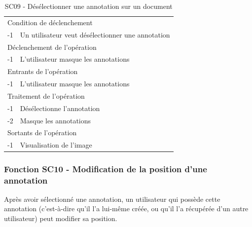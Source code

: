 \documentclass[a4paper]{article}
\begin{document}
\begin{table}[H]
  \centering
   \small
	\begin{tabular}{|c|p{12cm}|}
   		\hline
   			\rowcolor{lightgray}\multicolumn{2}{|c|}{\textbf{SC09 - Désélectionner une annotation sur un document}} \\
   		\hline
   			\multicolumn{2}{|l|}{Condition de d\'eclenchement} \\
   		\hline
   			-1 & Un utilisateur veut désélectionner une annotation\\
   		\hline
   			\multicolumn{2}{|l|}{D\'eclenchement de l'op\'eration} \\
   		\hline
   			-1 & L’utilisateur masque les annotations\\
   		\hline
   			\multicolumn{2}{|l|}{Entrants de l'op\'eration} \\
   		\hline
   			-1 & L’utilisateur masque les annotations\\
   		\hline
   			\multicolumn{2}{|l|}{Traitement de l'op\'eration} \\
  		\hline
   			-1 & Désélectionne l’annotation\\
			-2 & Masque les annotations\\
   		\hline
   			\multicolumn{2}{|l|}{Sortants de l'op\'eration} \\
   		\hline
   			-1 & Visualisation de l’image\\
   		\hline
	\end{tabular}
  \caption{SC09 - Désélectionner une annotation sur un document}
  \normalsize
  \label{tab:deselectionner_annotation}
\end{table}

\subsubsection{Fonction SC10 - Modification de la position d’une annotation}
Après avoir sélectionné une annotation, un utilisateur qui possède cette annotation (c’est-à-dire qu’il l’a lui-même créée, ou qu’il l’a récupérée d’un autre utilisateur) peut modifier sa position.\\
\end{document}
